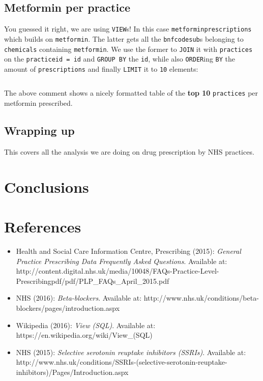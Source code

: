 \documentclass[english,a4paper,]{report}
\begin{document}
\inputminted[firstline=92,lastline=102]{sql}{src/sql/02-queries.sql}

\section{Metformin per practice}\label{metformin-per-practice}

You guessed it right, we are using \texttt{VIEW}s! In this case
\texttt{metforminprescriptions} which builds on \texttt{metformin}. The
latter gets all the \texttt{bnfcodesub}s belonging to \texttt{chemicals}
containing \texttt{metformin}. We use the former to \texttt{JOIN} it
with \texttt{practices} on the \texttt{practiceid\ =\ id} and
\texttt{GROUP\ BY} the \texttt{id}, while also \texttt{ORDER}ing
\texttt{BY} the amount of \texttt{prescriptions} and finally
\texttt{LIMIT} it to \texttt{10} elements:

\inputminted[firstline=107]{sql}{src/sql/02-queries.sql}

The above comment shows a nicely formatted table of the \textbf{top 10}
\texttt{practices} per metformin prescribed.

\section{Wrapping up}\label{wrapping-up-2}

This covers all the analysis we are doing on drug prescription by NHS
practices.

\chapter{Conclusions}\label{conclusions}

\chapter{References}\label{references}

\begin{itemize}
\item
  Health and Social Care Information Centre, Prescribing (2015):
  \emph{General Practice Prescribing Data Frequently Asked Questions}.
  Available at:
  http://content.digital.nhs.uk/media/10048/FAQs-Practice-Level-Prescribingpdf/pdf/PLP\_FAQs\_April\_2015.pdf
\item
  NHS (2016): \emph{Beta-blockers}. Available at:
  http://www.nhs.uk/conditions/beta-blockers/pages/introduction.aspx
\item
  Wikipedia (2016): \emph{View (SQL)}. Available at:
  https://en.wikipedia.org/wiki/View\_(SQL)
\item
  NHS (2015): \emph{Selective serotonin reuptake inhibitors (SSRIs)}.
  Available at:
  http://www.nhs.uk/conditions/SSRIs-(selective-serotonin-reuptake-inhibitors)/Pages/Introduction.aspx
\end{itemize}
\end{document}
